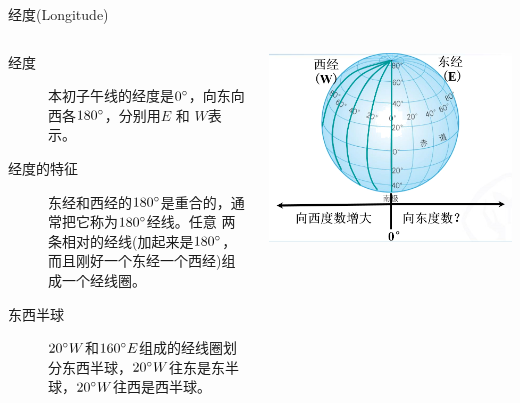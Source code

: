 \documentclass[10pt]{ctexbeamer}
\begin{document}
    \begin{frame}{经度(Longitude)}
        \begin{columns}
            \begin{description}
                \item[经度] \alert{本初子午线的经度是$0\degree$}，向东向西各$180\degree$，分别用$E$ 和 $W$表示。\\
                \item[经度的特征] 东经和西经的$180\degree$是重合的，通常把它称为$180\degree$经线。任意
                    两条相对的经线(加起来是$180\degree$，而且刚好一个东经一个西经)组成一个经线圈。\\
                \item[东西半球] \alert{$20\degree W$和$160\degree E$组成的经线圈划分东西半球}，$20\degree W$往东是东半球，$20\degree W$往西是西半球。
            \end{description}
            \includegraphics[width=.99\textwidth]{assets/longitude.png}
        \end{columns}
        
    \end{frame}
\end{document}
